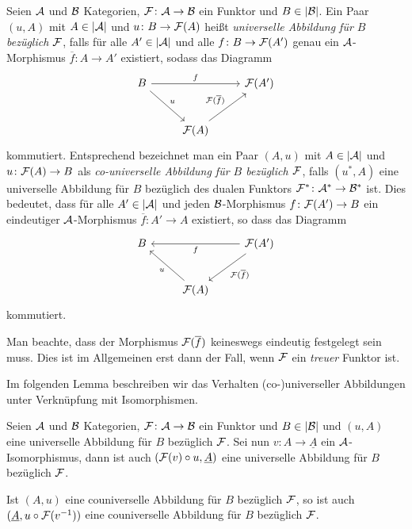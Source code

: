 \begin{defn}
  Seien $\mathcal{A}$ und $\mathcal{B}$ Kategorien, $\mathcal{F} \colon \mathcal{A} \to \mathcal{B}$ ein Funktor und $B \in |\mathcal{B}|$.
  Ein Paar $(u, A)$ mit $A \in |\mathcal{A}|$ und $u \colon B \to \mathcal{F}(A)$ heißt \emph{universelle Abbildung für $B$ bezüglich $\mathcal{F}$}, falls für alle $A' \in |\mathcal{A}|$ und alle $f \colon B \to \mathcal{F}(A')$ genau ein $\mathcal{A}$-Morphismus $\overline f \colon A \to A'$ existiert, sodass das Diagramm
  $$
  \begin{tikzcd}[row sep=2.5em]
    B \arrow[rd,"u"] \arrow[rr, "f"] &&\F(A') \\
    &\F(A) \arrow[ru, "\F(\overline{f})"]
  \end{tikzcd}
  $$
  kommutiert.
  Entsprechend bezeichnet man ein Paar $(A,u)$ mit $A \in |\mathcal{A}|$ und $u \colon \mathcal{F}(A) \to B$ als \emph{co-universelle Abbildung für $B$ bezüglich $\mathcal{F}$}, falls $(u^*, A)$ eine universelle Abbildung für $B$ bezüglich des dualen Funktors $\mathcal{F}^* \colon \mathcal{A}^* \to \mathcal{B}^*$ ist.
  Dies bedeutet, dass für alle $A' \in |\mathcal{A}|$ und jeden $\mathcal{B}$-Morphismus $f \colon \mathcal{F}(A') \to B$ ein eindeutiger $\mathcal{A}$-Morphismus $\overline f \colon A' \to A$ existiert, so dass das Diagramm
  $$
  \begin{tikzcd}[row sep=2.5em]
    B  &&  \arrow[ll, "f"] \F(A')\arrow[ld, "\F(\overline{f})"]  \\
    & \arrow[lu,"u"]\F(A) & 
  \end{tikzcd}
  $$
  kommutiert.
\end{defn}

Man beachte, dass der Morphismus $\mathcal{F}(\overline f)$ keineswegs eindeutig festgelegt sein muss. Dies ist im Allgemeinen erst dann der Fall, wenn $\mathcal{F}$ ein \emph{treuer} Funktor ist.

Im folgenden Lemma beschreiben wir das Verhalten (co-)universeller Abbildungen unter Verknüpfung mit Isomorphismen.

\begin{lem}
  \label{lem:universalCircIso}
  Seien $\mathcal{A}$ und $\mathcal{B}$ Kategorien, $\mathcal{F} \colon \mathcal{A} \to \mathcal{B}$ ein Funktor und $B \in |\mathcal{B}|$ und $(u,A)$ eine universelle Abbildung für $B$ bezüglich $\mathcal{F}$.
  Sei nun $v \colon A \to \underline A$ ein $\mathcal{A}$-Isomorphismus, dann ist auch $(\mathcal{F}(v) \circ u, \underline A )$ eine universelle Abbildung für $B$ bezüglich $\mathcal{F}$.

  Ist $(A, u)$ eine couniverselle Abbildung für $B$ bezüglich $\mathcal{F}$, so ist auch $(\underline A, u \circ \mathcal{F}(v^{-1}))$ eine couniverselle Abbildung für $B$ bezüglich $\mathcal{F}$.
\end{lem}

